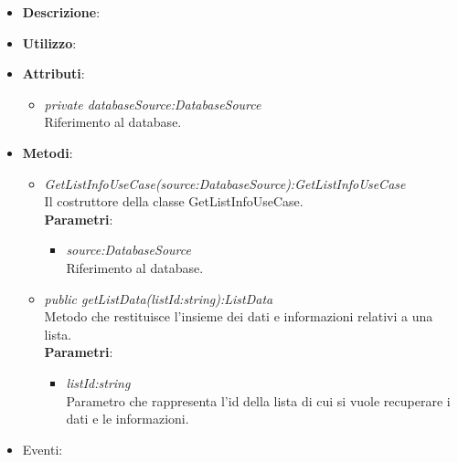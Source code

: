 \begin{itemize}
\item \textbf{Descrizione}: 
\item \textbf{Utilizzo}:
\item \textbf{Attributi}: 
	\begin{itemize}
	\item \textit{private databaseSource:DatabaseSource}\\
		Riferimento al database.
	\end{itemize}
\item \textbf{Metodi}:
	\begin{itemize}
	\item \textit{GetListInfoUseCase(source:DatabaseSource):GetListInfoUseCase}\\
	Il costruttore della classe GetListInfoUseCase.
			\\ \textbf{Parametri}: \begin{itemize}
			\item \textit{source:DatabaseSource}\\
		Riferimento al database.
			\end{itemize}
	\item \textit{public getListData(listId:string):ListData}\\
	Metodo che restituisce l'insieme dei dati e informazioni relativi a una lista.
				\\ \textbf{Parametri}: \begin{itemize}
				\item \textit{listId:string}\\
				Parametro che rappresenta l'id della lista di cui si vuole recuperare i dati e le informazioni.
				\end{itemize} 
	\end{itemize}
\item{Eventi}:
\end{itemize}